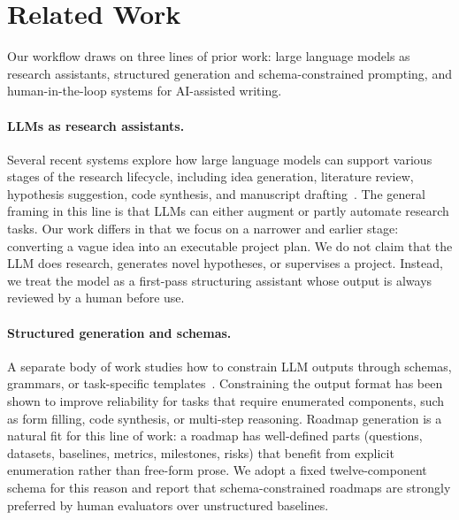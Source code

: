 \documentclass[11pt]{article}
\begin{document}
\section{Related Work}
\label{sec:related}

Our workflow draws on three lines of prior work: large language models as research assistants, structured generation and schema-constrained prompting, and human-in-the-loop systems for AI-assisted writing.

\paragraph{LLMs as research assistants.}
Several recent systems explore how large language models can support various stages of the research lifecycle, including idea generation, literature review, hypothesis suggestion, code synthesis, and manuscript drafting~\cite{wang2023scimon, lu2024aiscientist, baek2024researchagent, si2024llmideas}. The general framing in this line is that LLMs can either augment or partly automate research tasks. Our work differs in that we focus on a narrower and earlier stage: converting a vague idea into an executable project plan. We do not claim that the LLM does research, generates novel hypotheses, or supervises a project. Instead, we treat the model as a first-pass structuring assistant whose output is always reviewed by a human before use.

\paragraph{Structured generation and schemas.}
A separate body of work studies how to constrain LLM outputs through schemas, grammars, or task-specific templates~\cite{willard2023grammar, dong2023structured, zhou2023instructeval}. Constraining the output format has been shown to improve reliability for tasks that require enumerated components, such as form filling, code synthesis, or multi-step reasoning. Roadmap generation is a natural fit for this line of work: a roadmap has well-defined parts (questions, datasets, baselines, metrics, milestones, risks) that benefit from explicit enumeration rather than free-form prose. We adopt a fixed twelve-component schema for this reason and report that schema-constrained roadmaps are strongly preferred by human evaluators over unstructured baselines.
\end{document}
